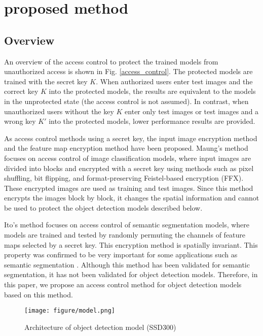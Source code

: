 \documentclass[conference,10pt,a4paper]{IEEEtran}
\begin{document}
\section{proposed method}
\subsection{Overview}
An overview of the access control to protect the trained models from unauthorized access is shown in Fig. \ref{access_control}. The protected models are trained with the secret key $K$.
When authorized users enter test images and the correct key $K$ into the protected models, the results are equivalent to the models in the unprotected state (the access control is not assumed). In contrast, when unauthorized users without the key $K$ enter only test images or test images and a wrong key $K'$ into the protected models, lower performance results are provided.\par
As access control methods using a secret key, the input image encryption method \cite{maungmaung_kiya_2021} and the feature map encryption method \cite{ito2021access} have been proposed.
Maung's method\cite{maungmaung_kiya_2021} focuses on access control of image classification models, where input images are divided into blocks and encrypted with a secret key using methods such as pixel shuffling, bit flipping, and format-preserving Feistel-based encryption (FFX)\cite{bellare2010addendum}. These encrypted images are used as training and test images. Since this method encrypts the images block by block, it changes the spatial information and cannot be used to protect the object detection models described below. \par
Ito's method \cite{ito2021access} focuses on access control of semantic segmentation models, where models are trained and tested by randomly permuting the channels of feature maps selected by a secret key. This encryption method is spatially invariant. This property was confirmed to be very important for some applications such as semantic segmentation \cite{ito2021access}. Although this method has been validated for semantic segmentation, it has not been validated for object detection models. 
Therefore, in this paper, we propose an access control method for object detection models based on this method.

\begin{figure*}[htb]
    \centering
     \texttt{[image: figure/model.png]}
    \caption{Architecture of object detection model (SSD300)}
    \label{proposed_model}
\end{figure*}
\end{document}

